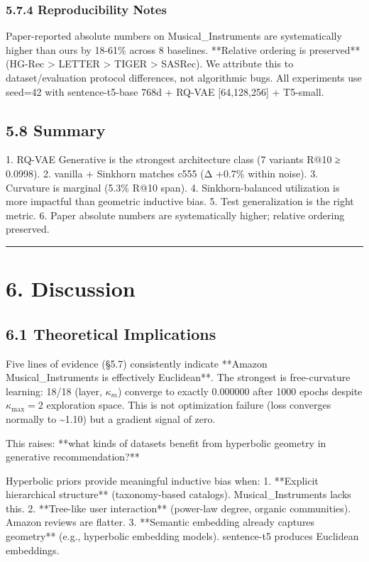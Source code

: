 \documentclass[11pt]{article}
\begin{document}
\subsubsection{5.7.4 Reproducibility Notes}

Paper-reported absolute numbers on Musical\_Instruments are systematically higher than ours by 18-61\% across 8 baselines. **Relative ordering is preserved** (HG-Rec > LETTER > TIGER > SASRec). We attribute this to dataset/evaluation protocol differences, not algorithmic bugs. All experiments use seed=42 with sentence-t5-base 768d + RQ-VAE [64,128,256] + T5-small.


\subsection{5.8 Summary}

1. RQ-VAE Generative is the strongest architecture class (7 variants R@10 ≥ 0.0998).
2. vanilla + Sinkhorn matches c555 (Δ +0.7\% within noise).
3. Curvature is marginal (5.3\% R@10 span).
4. Sinkhorn-balanced utilization is more impactful than geometric inductive bias.
5. Test generalization is the right metric.
6. Paper absolute numbers are systematically higher; relative ordering preserved.

\noindent\rule{\textwidth}{0.4pt}


\section{6. Discussion}


\subsection{6.1 Theoretical Implications}

Five lines of evidence (§5.7) consistently indicate **Amazon Musical\_Instruments is effectively Euclidean**. The strongest is free-curvature learning: 18/18 (layer, $\kappa_m$) converge to exactly 0.000000 after 1000 epochs despite $\kappa_{\max}=2$ exploration space. This is not optimization failure (loss converges normally to \textasciitilde{}1.10) but a gradient signal of zero.

This raises: **what kinds of datasets benefit from hyperbolic geometry in generative recommendation?**

Hyperbolic priors provide meaningful inductive bias when:
1. **Explicit hierarchical structure** (taxonomy-based catalogs). Musical\_Instruments lacks this.
2. **Tree-like user interaction** (power-law degree, organic communities). Amazon reviews are flatter.
3. **Semantic embedding already captures geometry** (e.g., hyperbolic embedding models). sentence-t5 produces Euclidean embeddings.
\end{document}
